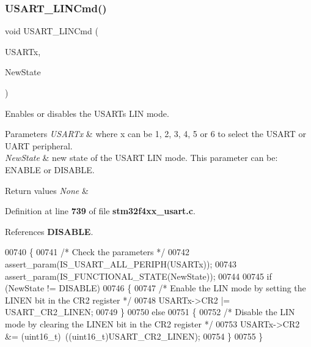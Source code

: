 \subsubsection{U\+S\+A\+R\+T\+\_\+\+L\+I\+N\+Cmd()}
{\footnotesize\ttfamily void U\+S\+A\+R\+T\+\_\+\+L\+I\+N\+Cmd (\begin{DoxyParamCaption}\item[{\textbf{ U\+S\+A\+R\+T\+\_\+\+Type\+Def} $\ast$}]{U\+S\+A\+R\+Tx,  }\item[{\textbf{ Functional\+State}}]{New\+State }\end{DoxyParamCaption})}



Enables or disables the U\+S\+A\+RT\textquotesingle{}s L\+IN mode. 


\begin{DoxyParams}{Parameters}
{\em U\+S\+A\+R\+Tx} & where x can be 1, 2, 3, 4, 5 or 6 to select the U\+S\+A\+RT or U\+A\+RT peripheral. \\
\hline
{\em New\+State} & new state of the U\+S\+A\+RT L\+IN mode. This parameter can be\+: E\+N\+A\+B\+LE or D\+I\+S\+A\+B\+LE. \\
\hline
\end{DoxyParams}

\begin{DoxyRetVals}{Return values}
{\em None} & \\
\hline
\end{DoxyRetVals}


Definition at line \textbf{ 739} of file \textbf{ stm32f4xx\+\_\+usart.\+c}.



References \textbf{ D\+I\+S\+A\+B\+LE}.


\begin{DoxyCode}
00740 \{
00741   \textcolor{comment}{/* Check the parameters */}
00742   assert_param(IS_USART_ALL_PERIPH(USARTx));
00743   assert_param(IS_FUNCTIONAL_STATE(NewState));
00744   
00745   \textcolor{keywordflow}{if} (NewState != DISABLE)
00746   \{
00747     \textcolor{comment}{/* Enable the LIN mode by setting the LINEN bit in the CR2 register */}
00748     USARTx->CR2 |= USART_CR2_LINEN;
00749   \}
00750   \textcolor{keywordflow}{else}
00751   \{
00752     \textcolor{comment}{/* Disable the LIN mode by clearing the LINEN bit in the CR2 register */}
00753     USARTx->CR2 &= (uint16\_t)~((uint16\_t)USART_CR2_LINEN);
00754   \}
00755 \}
\end{DoxyCode}
\mbox{\label{group__USART__Group4_ga39a3d33e23ee28529fa8f7259ce6811e}} 
